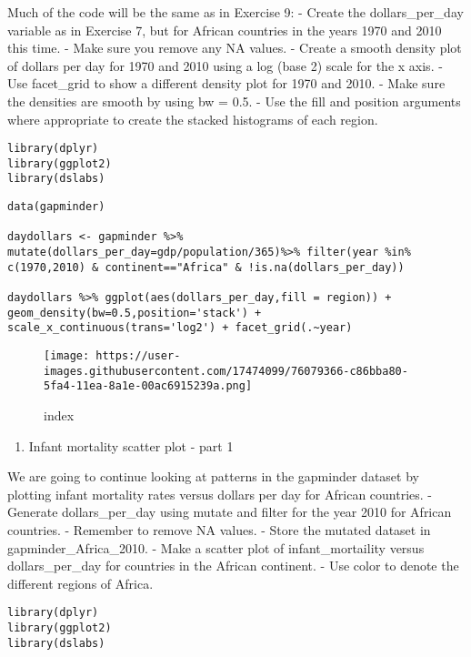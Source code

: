 \documentclass[]{article}
\providecommand{\tightlist}{%
  \setlength{\itemsep}{0pt}\setlength{\parskip}{0pt}}
\begin{document}
Much of the code will be the same as in Exercise 9: - Create the
dollars\_per\_day variable as in Exercise 7, but for African countries
in the years 1970 and 2010 this time. - Make sure you remove any NA
values. - Create a smooth density plot of dollars per day for 1970 and
2010 using a log (base 2) scale for the x axis. - Use facet\_grid to
show a different density plot for 1970 and 2010. - Make sure the
densities are smooth by using bw = 0.5. - Use the fill and position
arguments where appropriate to create the stacked histograms of each
region.

\begin{verbatim}
library(dplyr)
library(ggplot2)
library(dslabs)
\end{verbatim}

\begin{verbatim}
data(gapminder)

daydollars <- gapminder %>% mutate(dollars_per_day=gdp/population/365)%>% filter(year %in% c(1970,2010) & continent=="Africa" & !is.na(dollars_per_day))

daydollars %>% ggplot(aes(dollars_per_day,fill = region)) + geom_density(bw=0.5,position='stack') + scale_x_continuous(trans='log2') + facet_grid(.~year)
\end{verbatim}

\begin{figure}
\centering
\texttt{[image: https://user-images.githubusercontent.com/17474099/76079366-c86bba80-5fa4-11ea-8a1e-00ac6915239a.png]}
\caption{index}
\end{figure}

\begin{enumerate}
\def\labelenumi{\arabic{enumi}.}
\setcounter{enumi}{10}
\tightlist
\item
  Infant mortality scatter plot - part 1
\end{enumerate}

We are going to continue looking at patterns in the gapminder dataset by
plotting infant mortality rates versus dollars per day for African
countries. - Generate dollars\_per\_day using mutate and filter for the
year 2010 for African countries. - Remember to remove NA values. - Store
the mutated dataset in gapminder\_Africa\_2010. - Make a scatter plot of
infant\_mortaility versus dollars\_per\_day for countries in the African
continent. - Use color to denote the different regions of Africa.

\begin{verbatim}
library(dplyr)
library(ggplot2)
library(dslabs)
\end{verbatim}
\end{document}

